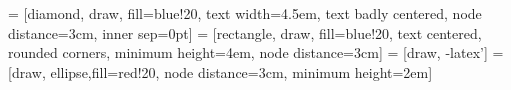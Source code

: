 \newcommand{\addcustomplot}[4]{	
	{
		\addplot[scatter, color=#2,
		scatter/@pre marker code/.style={/tikz/mark size=2.0pt},
		scatter/@post marker code/.style={},
		line width = 1.5pt
		]
		table[x index=0,y index=#3, col sep=comma] {#1};
		\addlegendentryexpanded{#4}
	}
}


\newcommand{\plotfile}[1]{
	\pgfplotstableread{#1}{\table}
	\pgfplotstablegetcolsof{#1}
	\pgfmathtruncatemacro\numberofcols{\pgfplotsretval-1}
	\pgfplotsinvokeforeach{1,...,\numberofcols}{
		\pgfplotstablegetcolumnnamebyindex{##1}\of{\table}\to{\colname}
		\addplot table [y index=##1] {#1}; 
		\addlegendentryexpanded{\colname}
	}
}

\newcommand{\stencilpt}[4][]{\node[circle,draw,inner sep=0.1em,minimum size=0.8cm,font=\tiny,#1] at (#2) (#3) {#4}}




 = [diamond, draw, fill=blue!20, 
text width=4.5em, text badly centered, node distance=3cm, inner sep=0pt]
 = [rectangle, draw, fill=blue!20, 
 text centered, rounded corners, minimum height=4em, node distance=3cm]
 = [draw, -latex']
 = [draw, ellipse,fill=red!20, node distance=3cm,
minimum height=2em]